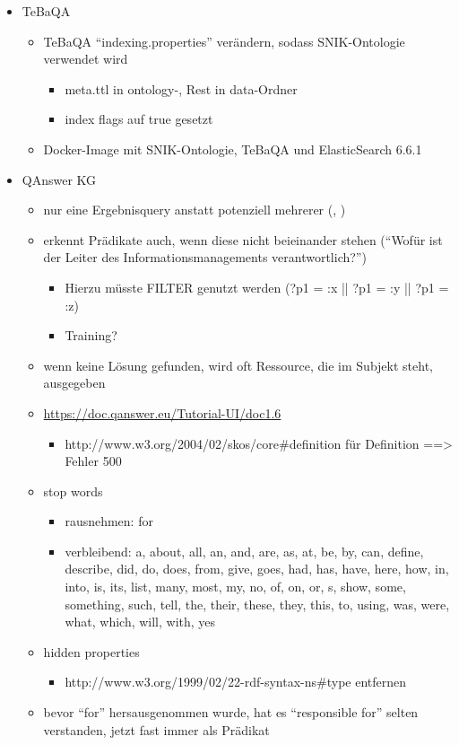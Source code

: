 \begin{itemize}
  \item{TeBaQA}
  \begin{itemize}
    \item TeBaQA \enquote{indexing.properties} verändern, sodass SNIK-Ontologie verwendet wird
    \begin{itemize}
      \item meta.ttl in ontology-, Rest in data-Ordner
      \item index flags auf true gesetzt
    \end{itemize}
    \item Docker-Image mit SNIK-Ontologie, TeBaQA und ElasticSearch 6.6.1
  \end{itemize}
  \item QAnswer KG
  \begin{itemize}
    \item nur eine Ergebnisquery anstatt potenziell mehrerer (, )
    \item erkennt Prädikate auch, wenn diese nicht beieinander stehen (\enquote{Wofür ist der Leiter des Informationsmanagements verantwortlich?})
    \begin{itemize}
      \item Hierzu müsste FILTER genutzt werden (?p1 = :x || ?p1 = :y || ?p1 = :z)
      \item Training?
    \end{itemize}
    \item wenn keine Lösung gefunden, wird oft Ressource, die im Subjekt steht, ausgegeben
    \item \url{https://doc.qanswer.eu/Tutorial-UI/doc1.6}
    \begin{itemize}
      \item http://www.w3.org/2004/02/skos/core\#definition für Definition ==> Fehler 500
    \end{itemize}
    \item stop words
    \begin{itemize}
      \item rausnehmen: for
      \item verbleibend: a, about, all, an, and, are, as, at, be, by, can, define, describe, did, do, does, from, give, goes, had, has, have, here, how, in, into, is, its, list, many, most, my, no, of, on, or, s, show, some, something, such, tell, the, their, these, they, this, to, using, was, were, what, which, will, with, yes
    \end{itemize}
    \item hidden properties
    \begin{itemize}
      \item http://www.w3.org/1999/02/22-rdf-syntax-ns\#type entfernen
    \end{itemize}
    \item bevor \enquote{for} hersausgenommen wurde, hat es \enquote{responsible for} selten verstanden, jetzt fast immer als Prädikat
  \end{itemize}
\end{itemize}
